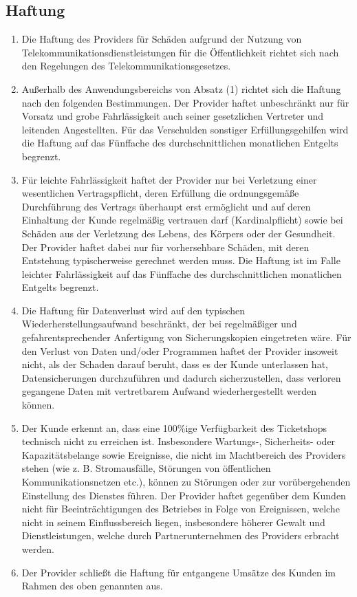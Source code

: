 \documentclass{terms}
\begin{document}
\subsection{Haftung}
\begin{enumerate}
\item Die Haftung des Providers für Schäden aufgrund der Nutzung von Telekommunikationsdienstleistungen für die Öffentlichkeit richtet sich nach den Regelungen des Telekommunikationsgesetzes.
\item Außerhalb des Anwendungsbereichs von Absatz (1) richtet sich die Haftung nach den folgenden Bestimmungen. Der Provider haftet unbeschränkt nur für Vorsatz und grobe Fahrlässigkeit auch seiner gesetzlichen Vertreter und leitenden Angestellten. Für das Verschulden sonstiger Erfüllungsgehilfen wird die Haftung auf das Fünffache des durchschnittlichen monatlichen Entgelts begrenzt.
\item Für leichte Fahrlässigkeit haftet der Provider nur bei Verletzung einer wesentlichen Vertragspflicht, deren Erfüllung die ordnungsgemäße Durchführung des Vertrags überhaupt erst ermöglicht und auf deren Einhaltung der Kunde regelmäßig vertrauen darf (Kardinalpflicht) sowie bei Schäden aus der Verletzung des Lebens, des Körpers oder der Gesundheit. Der Provider haftet dabei nur für vorhersehbare Schäden, mit deren Entstehung typischerweise gerechnet werden muss. Die Haftung ist im Falle leichter Fahrlässigkeit auf das Fünffache des durchschnittlichen monatlichen Entgelts begrenzt.
\item Die Haftung für Datenverlust wird auf den typischen Wiederherstellungsaufwand beschränkt, der bei regelmäßiger und gefahrentsprechender Anfertigung von Sicherungskopien eingetreten wäre. Für den Verlust von Daten und/oder Programmen haftet der Provider insoweit nicht, als der Schaden darauf beruht, dass es der Kunde unterlassen hat, Datensicherungen durchzuführen und dadurch sicherzustellen, dass verloren gegangene Daten mit vertretbarem Aufwand wiederhergestellt werden können.
\item Der Kunde erkennt an, dass eine 100\%ige Verfügbarkeit des Ticketshops technisch nicht zu erreichen ist. Insbesondere Wartungs-, Sicherheits- oder Kapazitätsbelange sowie Ereignisse, die nicht im Machtbereich des Providers stehen (wie z. B. Stromausfälle, Störungen von öffentlichen Kommunikationsnetzen etc.), können zu Störungen oder zur vorübergehenden Einstellung des Dienstes führen. Der Provider haftet gegenüber dem Kunden nicht für Beeinträchtigungen des Betriebes in Folge von Ereignissen, welche nicht in seinem Einflussbereich liegen, insbesondere höherer Gewalt und Dienstleistungen, welche durch Partnerunternehmen des Providers erbracht werden.
\item Der Provider schließt die Haftung für entgangene Umsätze des Kunden im Rahmen des oben genannten aus.
\end{enumerate}
\end{document}
